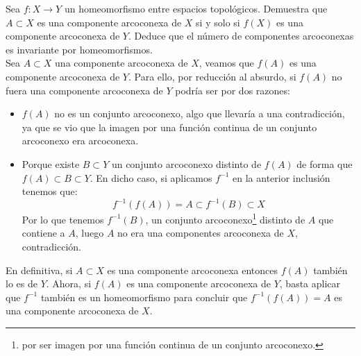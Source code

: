 \begin{ejercicio}
    Sea $f:X\to Y$ un homeomorfismo entre espacios topológicos. Demuestra que $A\subset X$ es una componente arcoconexa de $X$ si y solo si $f(X)$ es una componente arcoconexa de $Y$. Deduce que el número de componentes arcoconexas es invariante por homeomorfismos.\\

    \noindent
    Sea $A\subset X$ una componente arcoconexa de $X$, veamos que $f(A)$ es una componente arcoconexa de $Y$. Para ello, por reducción al absurdo, si $f(A)$ no fuera una componente arcoconexa de $Y$ podría ser por dos razones:
    \begin{itemize}
        \item $f(A)$ no es un conjunto arcoconexo, algo que llevaría a una contradicción, ya que se vio que la imagen por una función continua de un conjunto arcoconexo era arcoconexa.
        \item Porque existe $B\subset Y$ un conjunto arcoconexo distinto de $f(A)$ de forma que $f(A)\subset B\subset Y$. En dicho caso, si aplicamos $f^{-1}$ en la anterior inclusión tenemos que:
            \begin{equation*}
                f^{-1}(f(A)) = A \subset f^{-1}(B) \subset X
            \end{equation*}
            Por lo que tenemos $f^{-1}(B)$, un conjunto arcoconexo\footnote{por ser imagen por una función continua de un conjunto arcoconexo.} distinto de $A$ que contiene a $A$, luego $A$ no era una componentes arcoconexa de $X$, contradicción.
    \end{itemize}
    En definitiva, si $A\subset X$ es una componente arcoconexa entonces $f(A)$ también lo es de $Y$. Ahora, si $f(A)$ es una componente arcoconexa de $Y$, basta aplicar que $f^{-1}$ también es un homeomorfismo para concluir que $f^{-1}(f(A)) = A$ es una componente arcoconexa de $X$.\\


\end{ejercicio}

